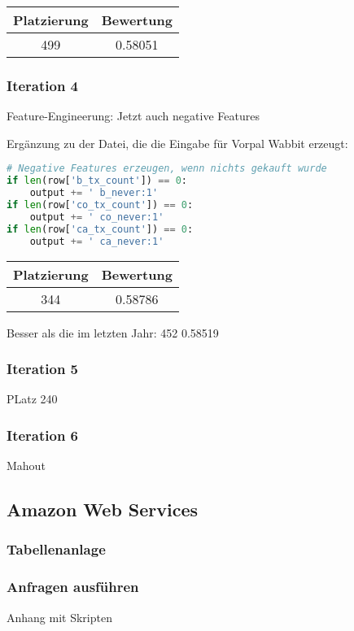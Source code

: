 \begin{tabular}{|c|c|}
	\hline \textbf{Platzierung} & \textbf{Bewertung} \\ 
	\hline 499 & 0.58051  \\ 
	\hline 
\end{tabular}

\subsubsection{Iteration 4}

Feature-Engineerung: Jetzt auch negative Features

Ergänzung zu der Datei, die die Eingabe für Vorpal Wabbit erzeugt:
\begin{lstlisting}[language=Python]
# Negative Features erzeugen, wenn nichts gekauft wurde
if len(row['b_tx_count']) == 0:
	output += ' b_never:1'
if len(row['co_tx_count']) == 0:
	output += ' co_never:1'
if len(row['ca_tx_count']) == 0:
	output += ' ca_never:1'
\end{lstlisting}

\begin{tabular}{|c|c|}
	\hline \textbf{Platzierung} & \textbf{Bewertung} \\ 
	\hline 344 & 0.58786  \\ 
	\hline 
\end{tabular}

Besser als die im letzten Jahr: 452 0.58519

\subsubsection{Iteration 5}

PLatz 240

\subsubsection{Iteration 6}

Mahout


	
\subsection{Amazon Web Services}

\subsubsection{Tabellenanlage}

\subsubsection{Anfragen ausführen}

Anhang mit Skripten

